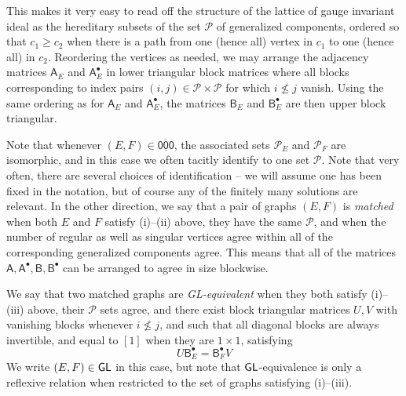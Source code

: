 \documentclass[12pt]{amsbook}%
\theoremstyle{defin}
\theoremstyle{remark}
\numberwithin{equation}{chapter}
\numberwithin{theor}{section}
\newcommand{\xyzrel}[1]{\mbox{$\overline{\underline{\mathsf{ #1}}}$}}
\newcommand{\GL}{{\sf GL}}
\begin{document}
This makes it very easy to read off the structure of the lattice of gauge invariant ideal as the hereditary subsets of the set $\mathcal P$ of generalized components, ordered so that $c_1 \geq c_2$ when there is a path from one (hence all) vertex in $c_1$ to one (hence all) in $c_2$.
Reordering the vertices as needed, we may arrange the adjacency matrices $\mathsf{A}_E$ and  $\mathsf{A}^\bullet_E$ in lower triangular block matrices where all blocks corresponding to index pairs $(i,j)\in\mathcal P\times \mathcal P$ for which $i\not\leq j$ vanish.
Using the same ordering as for   $\mathsf{A}_E$ and  $\mathsf{A}^\bullet_E$, the matrices $\mathsf{B}_E$ and  $\mathsf{B}^\bullet_E$ are then upper block triangular.



Note that whenever $(E,F)\in\xyzrel{000}$, the associated  sets $\mathcal P_E$ and $\mathcal P_F$ are isomorphic, and in this case we often tacitly identify to one set $\mathcal P$. Note that very often, there are several choices of identification -- we will assume one has been fixed in the notation, but of course any of the finitely many solutions are relevant.
In the other direction, we say that a pair of graphs $(E,F)$ is \emph{matched} when both $E$ and $F$  satisfy (i)--(ii) above, they have the same $\mathcal P$,  and when the number of regular as well as singular vertices agree within all of the corresponding generalized components agree. This means that all of the matrices $\mathsf{A},\mathsf{A}^\bullet,\mathsf{B},\mathsf{B}^{\bullet}$ can be arranged to agree in size blockwise.



We say that two matched graphs are 
 \emph{\GL-equivalent}\index{GL-equivalence@\GL-equivalence} when they both satisfy (i)--(iii) above, their $\mathcal P$ sets agree, and there exist block triangular matrices $U,V$ with vanishing blocks whenever $i\not\leq j$, and such that all diagonal blocks are always invertible, and equal to $[1]$ when they are $1\times 1$, satisfying
\begin{equation}\label{GLdef}
U\mathsf{B}^\bullet_E=\mathsf{B}^\bullet_FV
\end{equation}
We write $(E,F)\in\GL$ in this case, but note that $\GL$-equivalence is only a reflexive relation when restricted to the set of graphs satisfying (i)--(iii).
\end{document}
